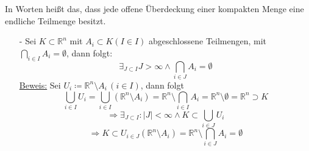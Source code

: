 \begin{itemize}
	In Worten heißt das, dass jede offene Überdeckung einer kompakten Menge eine endliche Teilmenge besitzt.
	\begin{itemize}
		\item[-] Sei $K \subset \mathbb{R}^n$ mit $A_i \subset K (I \in I)$ abgeschlossene Teilmengen, mit $\bigcap_{i \in I} A_i = \emptyset$, dann folgt:
		\[ \exists_{J \subset I} J > \infty \wedge \bigcap_{i \in J} A_i = \emptyset \]
		\underline{Beweis:} Sei $U_i \coloneqq \mathbb{R}^n \setminus A_i \, (i \in I)$, dann folgt
		\[ \bigcup_{i \in I} U_i = \bigcup_{i \in I} (\mathbb{R}^n \setminus A_i) = \mathbb{R}^n \setminus \bigcap_{i \in I} A_i = \mathbb{R}^n \setminus \emptyset = \mathbb{R}^n \supset K \]
		\[\Rightarrow \exists_{J \subset I}\colon |J| < \infty \wedge K \subset \bigcup_{i \in J} U_i\]
		\[\Rightarrow K \subset U_{i \in J} (\mathbb{R}^n \setminus A_i) = \mathbb{R}^n \setminus \bigcap_{i \in J} A_i = \emptyset\]
	\end{itemize}
 \end{itemize}
